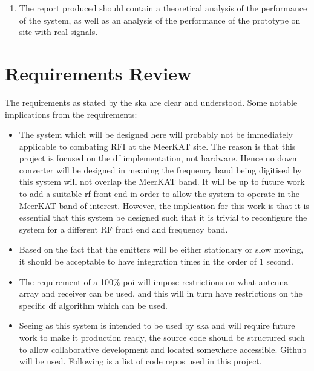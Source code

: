\begin{enumerate}
  \item The report produced should contain a theoretical analysis of the performance of the system, as well as an analysis of the performance of the prototype on site with real signals. 
\end{enumerate}

\section{Requirements Review}
The requirements as stated by the \gls{ska} are clear and understood. Some notable implications from the requirements:

\begin{itemize}
  \item The system which will be designed here will probably not be immediately applicable to combating RFI at the MeerKAT site. The reason is that this project is focused on the \gls{df} implementation, not hardware. Hence no down converter will be designed in meaning the frequency band being digitised by this system will not overlap the MeerKAT band. 
    It will be up to future work to add a suitable \gls{rf} front end in order to allow the system to operate in the MeerKAT band of interest. However, the implication for this work is that it is essential that this system be designed such that it is trivial to reconfigure the system for a different RF front end and frequency band. 

  \item Based on the fact that the emitters will be either stationary or slow moving, it should be acceptable to have integration times in the order of 1 second. 

  \item The requirement of a 100\% \gls{poi} will impose restrictions on what antenna array and receiver can be used, and this will in turn have restrictions on the specific \gls{df} algorithm which can be used. 

  \item Seeing as this system is intended to be used by \gls{ska} and will require future work to make it production ready, the source code should be structured such to allow collaborative development and located somewhere accessible. Github will be used. Following is a list of code repos used in this project. 

\end{itemize}

